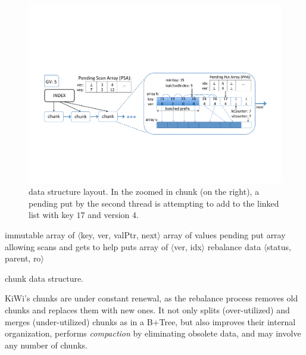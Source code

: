 \begin{figure}[t]
  \centering
  \includegraphics[width=.8\linewidth]{kiwi-layout3.pdf}
  \caption{{{\kiwi} data structure layout. In the zoomed in chunk (on the right), a pending put by the second
thread is attempting to add  to the linked list with key $17$ and version $4$.}}
  \label{fig:overview-new}
\end{figure}

\begin{algorithm}[t]
\codesize
\begin{center}
\begin{algorithmic}
	\State immutable   
	\State array  of $\langle$key, ver, valPtr, next$\rangle$    
	\State array  of values									
	\State {}  %
	\State {} 
\LineComment pending put array allowing scans and gets to help puts
	\State array  of $\langle$ver, idx$\rangle$
	\State {} 
	\State rebalance data $\langle$status, parent, ro$\rangle$ 
\vspace{-1em}
\end{algorithmic}
\end{center}
\caption{{\kiwi} chunk data structure.}
\label{alg:chunk}
\end{algorithm}


KiWi's chunks are under constant renewal, as the rebalance process removes old chunks and replaces them with new ones.
It not only splits (over-utilized) and merges (under-utilized) chunks as in a B+Tree, but also improves their internal
organization, performs \emph{compaction} by eliminating obsolete data, and may involve any number of chunks.

